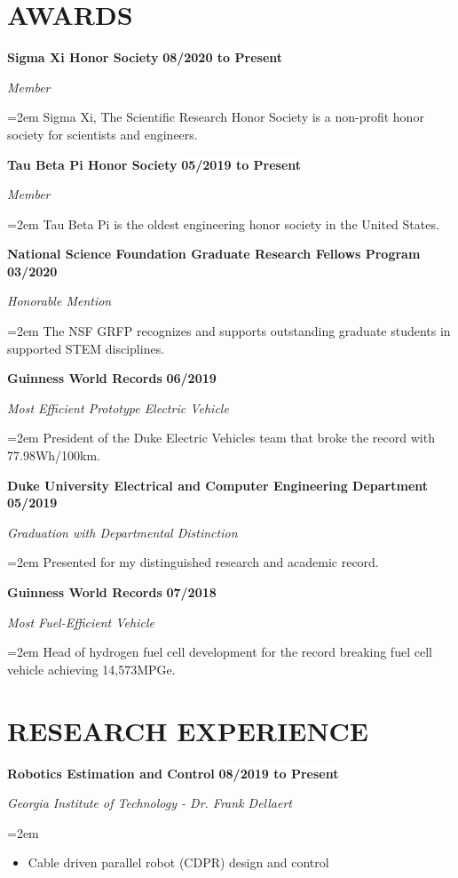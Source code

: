 \documentclass[paper=letter,fontsize=11pt]{scrartcl} %
\newcommand{\sepspace}{\vspace*{0em}}		%
\newcommand{\NewPart}[2]{\section*{\uppercase{#1} #2}}
\newcommand{\EducationEntry}[4]{
		\noindent \textbf{#1} \hfill      %
		\colorbox{White}{%
			\bf 
			\parbox{10em}{%
			\hfill\color{Black}#2}} \par  %
		\noindent \textit{#3} \par        %
		\noindent\hangindent=2em\hangafter=0 \small #4 %
		\normalsize \par}
\newcommand{\AwardEntry}[4]{
	\noindent \textbf{#1} \hfill      %
	\colorbox{White}{%
		\bf 
		\hfill\color{Black}#2} \par  %
	\noindent \textit{#3} \par        %
	\noindent\hangindent=2em\hangafter=0 \small #4 %
	\normalsize \par}
\newcommand{\WorkEntry}[4]{				  %
		\noindent \textbf{#1} \hfill      %
		\colorbox{White}{\bf \color{Black}#2} \par  %
		\noindent \textit{#3} \par              %
		\noindent\hangindent=2em\hangafter=0 \small #4 %
		\normalsize \par}
\begin{document}
\NewPart{Awards}{}
\AwardEntry{Sigma Xi Honor Society}{08/2020 to Present}
	{Member}
	{Sigma Xi, The Scientific Research Honor Society is a non-profit honor society for scientists and engineers.}
\AwardEntry{Tau Beta Pi Honor Society}{05/2019 to Present}
	{Member}
	{Tau Beta Pi is the oldest engineering honor society in the United States.}
\clearpage
\AwardEntry{National Science Foundation Graduate Research Fellows Program}{03/2020}
	{Honorable Mention}
	{The NSF GRFP recognizes and supports outstanding graduate students in supported STEM disciplines.}
\AwardEntry{Guinness World Records}{06/2019}
	{Most Efficient Prototype Electric Vehicle}
	{President of the Duke Electric Vehicles team that broke the record with 77.98Wh/100km.}
\AwardEntry{Duke University Electrical and Computer Engineering Department}{05/2019}
	{Graduation with Departmental Distinction}
	{Presented for my distinguished research and academic record.}
\AwardEntry{Guinness World Records}{07/2018}
	{Most Fuel-Efficient Vehicle}
	{Head of hydrogen fuel cell development for the record breaking fuel cell vehicle achieving 14,573MPGe.}

\NewPart{Research Experience}{}

\WorkEntry{Robotics Estimation and Control}{08/2019 to Present}{Georgia Institute of Technology - Dr. Frank Dellaert}{
	\begin{itemize}
		\item Cable driven parallel robot (CDPR) design and control
	\end{itemize}
}
\sepspace
\end{document}
